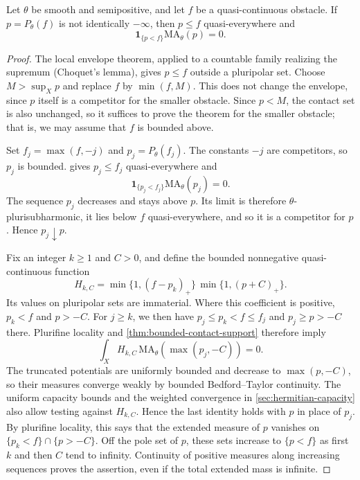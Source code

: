 

\begin{theorem}
\label{thm:envelope-contact}
Let $\theta$ be smooth and semipositive, and let $f$ be a quasi-continuous obstacle. If $p=P_\theta(f)$ is not identically $-\infty$, then $p\leq f$ quasi-everywhere and
\[
 \mathbf1_{\{p<f\}}\mathrm{MA}_\theta(p)=0.
\]
\end{theorem}
\begin{proof}
The local envelope theorem, applied to a countable family realizing the supremum (Choquet's lemma), gives $p\leq f$ outside a pluripolar set. Choose $M>\sup_Xp$ and replace $f$ by $\min(f,M)$. This does not change the envelope, since $p$ itself is a competitor for the smaller obstacle. Since $p<M$, the contact set is also unchanged, so it suffices to prove the theorem for the smaller obstacle; that is, we may assume that $f$ is bounded above.

Set $f_j=\max(f,-j)$ and $p_j=P_\theta(f_j)$. The constants $-j$ are competitors, so $p_j$ is bounded.  gives $p_j\leq f_j$ quasi-everywhere and
\[
 \mathbf1_{\{p_j<f_j\}}\mathrm{MA}_\theta(p_j)=0.
\]
The sequence $p_j$ decreases and stays above $p$. Its limit is therefore $\theta$-plurisubharmonic, it lies below $f$ quasi-everywhere, and so it is a competitor for $p$. Hence $p_j\downarrow p$.

Fix an integer $k\geq1$ and $C>0$, and define the bounded nonnegative quasi-continuous function
\[
 H_{k,C}=\min\{1,(f-p_k)_+\}\,
                  \min\{1,(p+C)_+\}.
\]
Its values on pluripolar sets are immaterial. Where this coefficient is positive, $p_k<f$ and $p>-C$. For $j\geq k$, we then have
$p_j\leq p_k<f\leq f_j$ and $p_j\geq p>-C$ there. Plurifine locality and \cref{thm:bounded-contact-support} therefore imply
\[
 \int_X H_{k,C}\,
       \mathrm{MA}_\theta(\max(p_j,-C))=0.
\]
The truncated potentials are uniformly bounded and decrease to $\max(p,-C)$, so their measures converge weakly by bounded Bedford--Taylor continuity. The uniform capacity bounds and the weighted convergence in \cref{sec:hermitian-capacity} also allow testing against $H_{k,C}$. Hence the last identity holds with $p$ in place of $p_j$.
By plurifine locality, this says that the extended measure of $p$ vanishes on
$\{p_k<f\}\cap\{p>-C\}$. Off the pole set of $p$, these sets increase to $\{p<f\}$ as first $k$ and then $C$ tend to infinity. Continuity of positive measures along increasing sequences proves the assertion, even if the total extended mass is infinite.
\end{proof}

